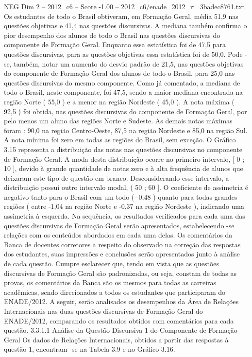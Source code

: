 \begin{textsample}{NEG Dim 2 – 2012\_c6 – Score -1.00 – 2012\_c6/enade\_2012\_ri\_3badec8761.txt}
Os estudantes de todo o Brasil obtiveram, em Formação Geral, média 51,9 nas questões objetivas e 41,4 nas questões discursivas.
A mediana também confirma o pior desempenho dos alunos de todo o Brasil nas questões discursivas do componente de Formação Geral.
Enquanto essa estatística foi de 47,5 para questões discursivas, para as questões objetivas essa estatística foi de 50,0.
Pode -se, também, notar um aumento do desvio padrão de 21,5, nas questões objetivas do componente de Formação Geral dos alunos de todo o Brasil, para 25,0 nas questões discursivas do mesmo componente.
Como já comentado, a mediana de todo o Brasil, neste componente, foi 47,5, sendo a maior mediana encontrada na região Norte ( 55,0 ) e a menor na região Nordeste ( 45,0 ).
A nota máxima ( 92,5 ) foi obtida, nas questões discursivas do componente de Formação Geral, por pelo menos um aluno das regiões Norte e Sudeste.
As demais notas máximas foram : 90,0 na região Centro-Oeste, 87,5 na região Nordeste e 85,0 na região Sul.
A nota mínima foi zero em todas as regiões do Brasil, sem exceção.
O Gráfico 3.15 representa a distribuição das notas nas questões discursivas no componente de Formação Geral.
A moda desta distribuição ocorre no primeiro intervalo, [ 0 ; 10 ], devido à grande quantidade de notas zero e à alta frequência de alunos que deixaram este tipo de questão em branco.
Desconsiderando esse intervalo, a distribuição possui outro intervalo modal, ( 50 ; 60 ].
O coeficiente de assimetria é negativo tanto para o Brasil com um todo ( -0,48 ) quanto para todas grandes regiões ( entre -1,04 na região Norte e -0,37 na região Nordeste ), indicando uma assimetria à esquerda.
Na sequência, os resultados verificados para cada uma das questões discursivas de Formação Geral serão apresentados, estabelecendo -se relações com os conteúdos abordados em cada uma delas.
Os comentários da Banca de docentes corretores a respeito do observado na correção das respostas dos estudantes, suas impressões e conclusões serão apresentados junto à análise de cada questão.
Cumpre esclarecer que, tendo em vista que as questões discursivas de Formação Geral são padronizadas, ou seja, constam de todas as provas, os comentários da Banca são os mesmos para todas as carreiras acadêmicas, sendo direcionados a todos os estudantes que participaram do ENADE/2012.
A seguir, serão analisados os desempenhos da Área de Relações Internacionais nas duas questões discursivas de Formação Geral do ENADE/2012, comparando os resultados obtidos com comentários para cada questão. 3.3.1.1 Análise da Questão Discursiva 1 do Componente de Formação Geral Os dados de Relações Internacionais, obtidos a partir das respostas à questão 1, encontram -se na Tabela 3.9 e no Gráfico 3.16.

\end{textsample}
